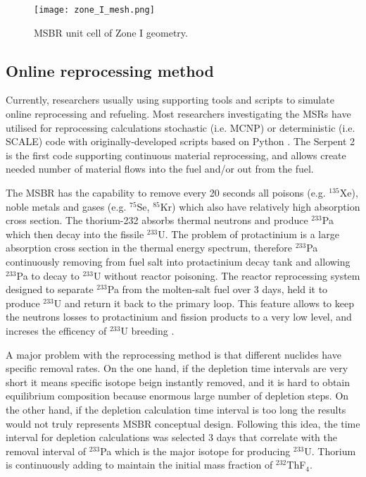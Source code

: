 \documentclass{anstrans}
\begin{document}
\begin{figure}[h] %
  \centering
  \vspace{-0.6em}
  \texttt{[image: zone\_I\_mesh.png]}
  \caption{MSBR unit cell of Zone I geometry.}
  \label{fig:zoneI}
\end{figure}
\subsection{Online reprocessing method}

Currently, researchers usually using supporting tools and scripts to simulate online reprocessing and refueling. Most researchers investigating the \gls{MSR}s have utilised for reprocessing calculations stochastic (i.e. \gls{MCNP}) or deterministic (i.e. SCALE) code with originally-developed scripts based on Python \cite{jeong_equilibrium_2016,park_whole_2015}. The Serpent 2 is the first code supporting continuous material reprocessing, and allows create needed number of material flows into the fuel and/or out from the fuel.

The \gls{MSBR} has the capability to remove every 20 seconds all poisons (e.g. $^{135}$Xe), noble metals and gases (e.g. $^{75}$Se, $^{85}$Kr) which also have relatively high absorption cross section. The thorium-232 absorbs thermal neutrons and produce $^{233}$Pa which then decay into the fissile $^{233}$U. The problem of protactinium is a large absorption cross section in the thermal energy spectrum, therefore $^{233}$Pa continuously removing from fuel salt into protactinium decay tank and allowing $^{233}$Pa to decay to $^{233}$U without reactor poisoning. The reactor reprocessing system designed to separate $^{233}$Pa from the molten-salt fuel over 3 days, held it to produce $^{233}$U and return it back to the primary loop. This feature allows to keep the neutrons losses to protactinium and fission products to a very low level, and increses the efficency of $^{233}$U breeding \cite{robertson_conceptual_1971}.

A major problem with the reprocessing method is that different nuclides have specific removal rates. On the one hand, if the depletion time intervals are very short it means specific isotope beign instantly removed, and it is hard to obtain equilibrium composition because enormous large number of depletion steps. On the other hand, if the depletion calculation time interval is too long the results would not truly represents \gls{MSBR} conceptual design. Following this idea, the time interval for depletion calculations was selected 3 days that correlate with the removal interval of $^{233}$Pa which is the major isotope for producing $^{233}$U. Thorium is continuously adding to maintain the initial mass fraction of $^{232}$ThF$_4$.
\end{document}
